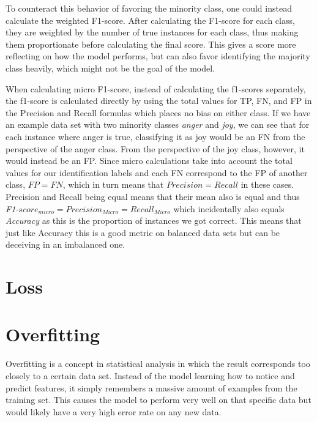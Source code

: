 \documentclass[nofilelist]{cslthse-msc}
\begin{document}
To counteract this behavior of favoring the minority class, one could instead calculate the weighted F1-score. After calculating the F1-score for each class, they are weighted by the number of true instances for each class, thus making them proportionate before calculating the final score. This gives a score more reflecting on how the model performs, but can also favor identifying the majority class heavily, which might not be the goal of the model.

When calculating micro F1-score, instead of calculating the f1-scores separately, the f1-score is calculated directly by using the total values for TP, FN, and FP in the Precision and Recall formulas which places no bias on either class. If we have an example data set with two minority classes \textit{anger} and \textit{joy}, we can see that for each instance where anger is true, classifying it as joy would be an FN from the perspective of the anger class. From the perspective of the joy class, however, it would instead be an FP. Since micro calculations take into account the total values for our identification labels and each FN correspond to the FP of another class, $FP = FN$, which in turn means that $Precision = Recall$ in these cases. Precision and Recall being equal means that their mean also is equal and thus \textit{F1-}$score_{micro} = Precision_{Micro} = Recall_{Micro}$ which incidentally also equals \textit{Accuracy} as this is the proportion of instances we got correct. This means that just like Accuracy this is a good metric on balanced data sets but can be deceiving in an imbalanced one.


\section{Loss}

\section{Overfitting}
Overfitting is a concept in statistical analysis in which the result corresponds too closely to a certain data set. Instead of the model learning how to notice and predict features, it simply remembers a massive amount of examples from the training set. This causes the model to perform very well on that specific data but would likely have a very high error rate on any new data. 
\end{document}

